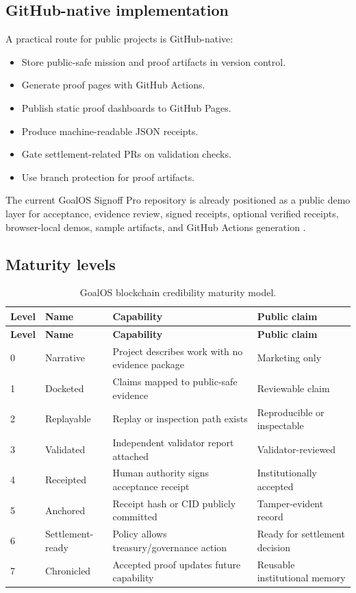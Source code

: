 \documentclass[11pt]{article}
\begin{document}
\subsection{GitHub-native implementation}

A practical route for public projects is GitHub-native:

\begin{itemize}
  \item Store public-safe mission and proof artifacts in version control.
  \item Generate proof pages with GitHub Actions.
  \item Publish static proof dashboards to GitHub Pages.
  \item Produce machine-readable JSON receipts.
  \item Gate settlement-related PRs on validation checks.
  \item Use branch protection for proof artifacts.
\end{itemize}

The current GoalOS Signoff Pro repository is already positioned as a public demo layer for acceptance, evidence review, signed receipts, optional verified receipts, browser-local demos, sample artifacts, and GitHub Actions generation \citep{goalosRepo,goalosReadme}.

\subsection{Maturity levels}

\begin{longtable}{p{} p{} p{} p{}}
\caption{GoalOS blockchain credibility maturity model.}\label{tab:maturity}\\
\toprule
\textbf{Level} & \textbf{Name} & \textbf{Capability} & \textbf{Public claim}\\
\midrule
\endfirsthead
\toprule
\textbf{Level} & \textbf{Name} & \textbf{Capability} & \textbf{Public claim}\\
\midrule
\endhead
0 & Narrative & Project describes work with no evidence package & Marketing only \\
1 & Docketed & Claims mapped to public-safe evidence & Reviewable claim \\
2 & Replayable & Replay or inspection path exists & Reproducible or inspectable \\
3 & Validated & Independent validator report attached & Validator-reviewed \\
4 & Receipted & Human authority signs acceptance receipt & Institutionally accepted \\
5 & Anchored & Receipt hash or CID publicly committed & Tamper-evident record \\
6 & Settlement-ready & Policy allows treasury/governance action & Ready for settlement decision \\
7 & Chronicled & Accepted proof updates future capability & Reusable institutional memory \\
\bottomrule
\end{longtable}
\end{document}
